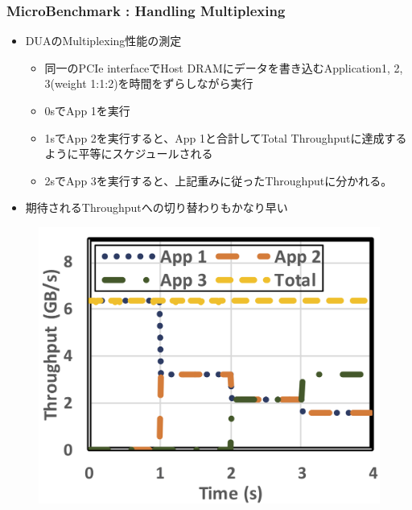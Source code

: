 \documentclass[dvipdfmx,9pt,notheorems]{beamer}
\theoremstyle{definition}
\begin{document}
\begin{frame}\frametitle{MicroBenchmark : Handling Multiplexing}
	\begin{itemize}
			\item DUAのMultiplexing性能の測定
				\begin{itemize}
					\item 同一のPCIe interfaceでHost DRAMにデータを書き込むApplication1, 2, 3(weight 1:1:2)を時間をずらしながら実行
					\item 0sでApp 1を実行
					\item 1sでApp 2を実行すると、App 1と合計してTotal Throughputに達成するように平等にスケジュールされる
					\item 2sでApp 3を実行すると、上記重みに従ったThroughputに分かれる。
				\end{itemize}
			\item 期待されるThroughputへの切り替わりもかなり早い
	\end{itemize}
  \begin{figure}[htb]
		\includegraphics[scale=1.0]{fig/figure11b.png}
  \end{figure}
\pnote{
}
\end{frame}
\end{document}
